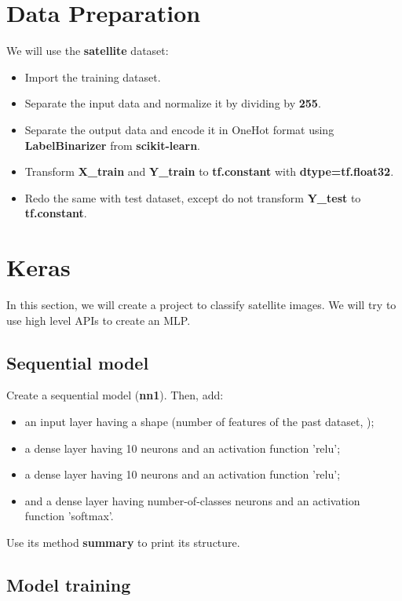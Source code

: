 \documentclass[11pt, a4paper]{article}
\begin{document}
\begin{multicols}{2}
	\section{Data Preparation}
	
	We will use the \textbf{satellite} dataset:
	\begin{itemize} 
		\item Import the training dataset. 
		\item Separate the input data and normalize it by dividing by \textbf{255}. 
		\item Separate the output data and encode it in OneHot format using \textbf{LabelBinarizer} from \textbf{scikit-learn}.
		\item Transform \textbf{X\_train} and \textbf{Y\_train} to \textbf{tf.constant} with \textbf{dtype=tf.float32}.
		\item Redo the same with test dataset, except do not transform \textbf{Y\_test} to \textbf{tf.constant}.
	\end{itemize}
	
	\section{Keras}
	
	In this section, we will create a project to classify satellite images.
	We will try to use high level APIs to create an MLP.
	
	\subsection{Sequential model}
	
	Create a sequential model (\textbf{nn1}). Then, add:
	\begin{itemize} 
		\item an input layer having a shape (number of features of the past dataset, );
		\item a dense layer having 10 neurons and an activation function 'relu';
		\item a dense layer having 10 neurons and an activation function 'relu';
		\item and a dense layer having number-of-classes neurons and an activation function 'softmax'.
	\end{itemize}
	Use its method \textbf{summary} to print its structure.
	
	\subsection{Model training}
	

\end{multicols}
\end{document}
